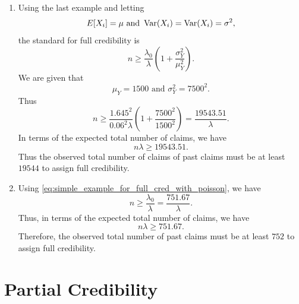 \documentclass[notoc,notitlepage]{tufte-book}
\begin{document}
\begin{solution}
  \begin{enumerate}
    \item Using the last example and letting
      \begin{equation*}
        E[X_i] = \mu   \text{ and } \operatorname{Var}(X_i) = \operatorname{Var}(X_i) = \sigma^2,
      \end{equation*}
      the standard for full credibility is
      \begin{equation*}
        n \geq \frac{\lambda_0}{\lambda} \left( 1 +
        \frac{\sigma^2_Y}{\mu^2_Y} \right).
      \end{equation*}
      We are given that
      \begin{equation*}
        \mu_Y = 1500 \text{ and } \sigma^2_Y = 7500^2.
      \end{equation*}
      Thus
      \begin{equation*}
        n \geq \frac{1.645^2}{0.06^2 \lambda} \left( 1 + \frac{7500^2}{1500^2}
        \right) = \frac{19543.51}{\lambda}.
      \end{equation*}
      In terms of the expected total number of claims, we have
      \begin{equation*}
        n\lambda \geq 19543.51.
      \end{equation*}
      Thus the observed total number of claims of past claims must be at least
      $19544$ to assign full credibility.

    \item Using \cref{eq:simple_example_for_full_cred_with_poisson}, we have
      \begin{equation*}
        n \geq \frac{\lambda_0}{\lambda} = \frac{751.67}{\lambda}.
      \end{equation*}
      Thus, in terms of the expected total number of claims, we have
      \begin{equation*}
        n\lambda \geq 751.67.
      \end{equation*}
      Therefore, the observed total number of past claims must be at least $752$ 
      to assign full credibility.
  \end{enumerate}
\end{solution}


\section{Partial Credibility}%
\label{sec:partial_credibility}
\end{document}
